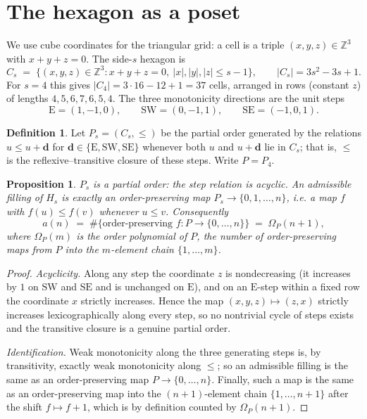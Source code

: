 \documentclass[11pt]{article}
\theoremstyle{plain}
\newtheorem{proposition}[theorem]{Proposition}
\theoremstyle{definition}
\newtheorem{definition}[theorem]{Definition}
\theoremstyle{remark}
\newcommand{\Eseq}{\mathrm{E}}
\newcommand{\SW}{\mathrm{SW}}
\newcommand{\SE}{\mathrm{SE}}
\newcommand{\Om}{\Omega}
\begin{document}
\section{The hexagon as a poset}\label{sec:poset}

We use cube coordinates for the triangular grid: a cell is a triple $(x,y,z)\in\mathbb Z^3$
with $x+y+z=0$. The side-$s$ hexagon is
\[
  C_s \;=\;\{(x,y,z)\in\mathbb Z^3 : x+y+z=0,\ |x|,|y|,|z|\le s-1\},
  \qquad |C_s|=3s^2-3s+1.
\]
For $s=4$ this gives $|C_4|=3\cdot 16-12+1=37$ cells, arranged in rows (constant $z$) of
lengths $4,5,6,7,6,5,4$. The three monotonicity directions are the unit steps
\[
  \Eseq=(1,-1,0),\qquad \SW=(0,-1,1),\qquad \SE=(-1,0,1).
\]

\begin{definition}\label{def:poset}
Let $P_s=(C_s,\le)$ be the partial order generated by the relations $u\le u+\mathbf d$ for
$\mathbf d\in\{\Eseq,\SW,\SE\}$ whenever both $u$ and $u+\mathbf d$ lie in $C_s$; that is,
$\le$ is the reflexive--transitive closure of these steps. Write $P=P_4$.
\end{definition}

\begin{proposition}\label{prop:order}
$P_s$ is a partial order: the step relation is acyclic. An admissible filling of $H_s$ is
exactly an order-preserving map $P_s\to\{0,1,\dots,n\}$, i.e. a map $f$ with $f(u)\le f(v)$
whenever $u\le v$. Consequently
\[
  a(n)\;=\;\#\{\text{order-preserving } f:P\to\{0,\dots,n\}\}\;=\;\Om_P(n+1),
\]
where $\Om_P(m)$ is the order polynomial of $P$, the number of order-preserving maps from $P$
into the $m$-element chain $\{1,\dots,m\}$.
\end{proposition}

\begin{proof}
\emph{Acyclicity.} Along any step the coordinate $z$ is nondecreasing (it increases by $1$ on
$\SW$ and $\SE$ and is unchanged on $\Eseq$), and on an $\Eseq$-step within a fixed row the
coordinate $x$ strictly increases. Hence the map $(x,y,z)\mapsto(z,x)$ strictly increases
lexicographically along every step, so no nontrivial cycle of steps exists and the transitive
closure is a genuine partial order.

\emph{Identification.} Weak monotonicity along the three generating steps is, by transitivity,
exactly weak monotonicity along $\le$; so an admissible filling is the same as an
order-preserving map $P\to\{0,\dots,n\}$. Finally, such a map is the same as an
order-preserving map into the $(n+1)$-element chain $\{1,\dots,n+1\}$ after the shift
$f\mapsto f+1$, which is by definition counted by $\Om_P(n+1)$.
\end{proof}
\end{document}
